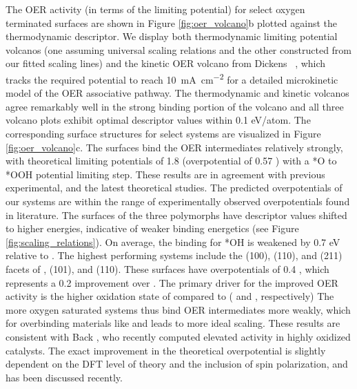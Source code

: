 %
The OER activity (in terms of the limiting potential) for select oxygen terminated surfaces are shown in Figure \ref{fig:oer_volcano}b plotted against the \DGOmOH thermodynamic descriptor.
%
We display both thermodynamic limiting potential volcanos
(one assuming universal scaling relations and the other constructed from our fitted scaling lines)
and the kinetic OER volcano from Dickens ~\cite{Dickens2019},
which tracks the required potential to reach \SI[mode=text]{10}{\mA\per\cm\squared} for a detailed microkinetic model of the OER associative pathway.
%
The thermodynamic and kinetic volcanos agree remarkably well in the strong binding portion of the volcano and all three volcano plots exhibit optimal \DGOmOH descriptor values within \num{0.1} eV/atom.
%
The corresponding surface structures for select systems are visualized in Figure \ref{fig:oer_volcano}c.
%
The \rIrOtwo surfaces bind the OER intermediates relatively strongly,
with theoretical limiting potentials of \mytilde\num{1.8} \VRHE (overpotential of \num{0.57} \VRHE) with a *O to *OOH potential limiting step.
%
These results are in agreement with previous experimental, and the latest theoretical studies.
%
The predicted overpotentials of our \rIrOtwo systems are within the range of experimentally observed overpotentials found in literature.
%
The surfaces of the three \IrOthree polymorphs have \DGOmOH descriptor values shifted to higher energies, indicative of weaker binding energetics (see Figure \ref{fig:scaling_relations}).
%
On average, the binding for *OH is weakened by 0.7 eV relative to \IrOtwo.
%
The highest performing systems include the (100), (110), and (211) facets of \aIrOthree, \bIrOthree (101), and \rIrOthree (110).
%
These surfaces have overpotentials of \mytilde\num{0.4} \VRHE,
which represents a \mytilde\num{0.2} \VRHE improvement over \rIrOtwo.
%
The primary driver for the improved OER activity is the higher oxidation state of \IrOthree compared to \IrOtwo
( and , respectively)
%
The more oxygen saturated \IrOthree systems thus bind OER intermediates more weakly, which for overbinding materials like \IrOtwo and \RhOtwo leads to more ideal scaling.
%
These results are consistent with Back , who recently computed elevated activity in highly oxidized \IrOthree catalysts.\cite{Back2019}
%
The exact improvement in the theoretical overpotential is slightly dependent on the DFT level of theory and the inclusion of spin polarization, and has been discussed recently.~\cite{Seitz2016,Strickler2019}
